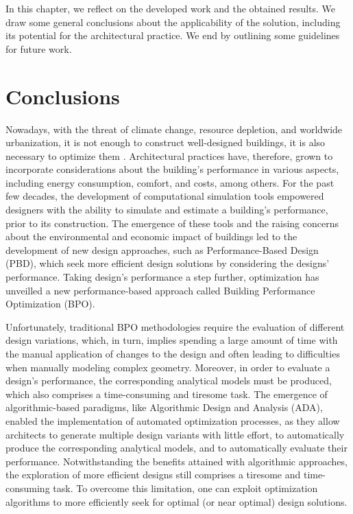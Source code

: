 \label{chap:conclusion}

In this chapter, we reflect on the developed work and the obtained results. We draw some general conclusions about the applicability of the solution, including its potential for the architectural practice. We end by outlining some guidelines for future work. 

\section{Conclusions}
Nowadays, with the threat of climate change, resource depletion, and worldwide urbanization, it is not enough to construct well-designed buildings, it is also necessary to optimize them \cite{Wortmann2015AdvSBO}. Architectural practices have, therefore, grown to incorporate considerations about the building's performance in various aspects, including energy consumption, comfort, and costs, among others. For the past few decades, the development of computational simulation tools empowered designers with the ability to simulate and estimate a building’s performance, prior to its construction. The emergence of these tools and the raising concerns about the environmental and economic impact of buildings led to the development of new design approaches, such as Performance-Based Design (\ac{PBD}), which seek more efficient design solutions by considering the designs’ performance. Taking design’s performance a step further, optimization has unveilled a new performance-based approach called Building Performance Optimization (\ac{BPO}). 

Unfortunately, traditional \ac{BPO} methodologies require the evaluation of different design variations, which, in turn, implies spending a large amount of time with the manual application of changes to the design and often leading to difficulties when manually modeling complex geometry. Moreover, in order to evaluate a design's performance, the corresponding analytical models must be produced, which also comprises a time-consuming and tiresome task. The emergence of algorithmic-based paradigms, like Algorithmic Design and Analysis (\ac{ADA}), enabled the implementation of automated optimization processes, as they allow architects to generate multiple design variants with little effort, to automatically produce the corresponding analytical models, and to automatically evaluate their performance. Notwithstanding the benefits attained with algorithmic approaches, the exploration of more efficient designs still comprises a tiresome and time-consuming task. To overcome this limitation, one can exploit optimization algorithms to more efficiently seek for optimal (or near optimal) design solutions.

